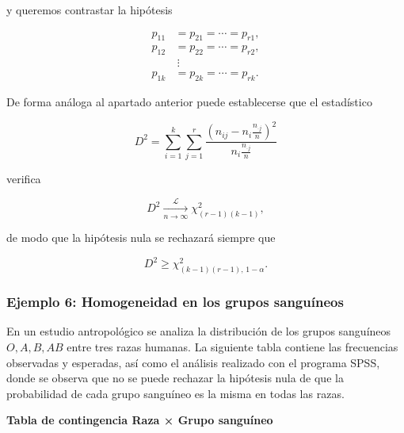 \documentclass[
]{article}
\begin{document}
y queremos contrastar la hipótesis

\[
\begin{aligned}
p_{11}&=p_{21}=\cdots=p_{r1},\\
p_{12}&=p_{22}=\cdots=p_{r2},\\
&\ \vdots\\
p_{1k}&=p_{2k}=\cdots=p_{rk}.
\end{aligned}
\]

De forma análoga al apartado anterior puede establecerse que el estadístico

\[
D^{2}=\sum_{i=1}^{k}\sum_{j=1}^{r}
\frac{\left(n_{ij}-n_{i}\frac{n_{\cdot j}}{n}\right)^{2}}
{n_{i}\frac{n_{\cdot j}}{n}}
\]

verifica

\[
D^{2}\xrightarrow[n\to\infty]{\mathcal{L}} \chi^{2}_{(r-1)(k-1)},
\]

de modo que la hipótesis nula se rechazará siempre que

\[
D^{2}\ge \chi^{2}_{(k-1)(r-1),\,1-\alpha}.
\]

\subsubsection{Ejemplo 6: Homogeneidad en los grupos sanguíneos}\label{ejemplo-6-homogeneidad-en-los-grupos-sanguuxedneos}

En un estudio antropológico se analiza la distribución de los grupos sanguíneos \(O,A,B,AB\) entre tres razas humanas. La siguiente tabla contiene las frecuencias observadas y esperadas, así como el análisis realizado con el programa SPSS, donde se observa que no se puede rechazar la hipótesis nula de que la probabilidad de cada grupo sanguíneo es la misma en todas las razas.

\textbf{Tabla de contingencia Raza × Grupo sanguíneo}
\end{document}
